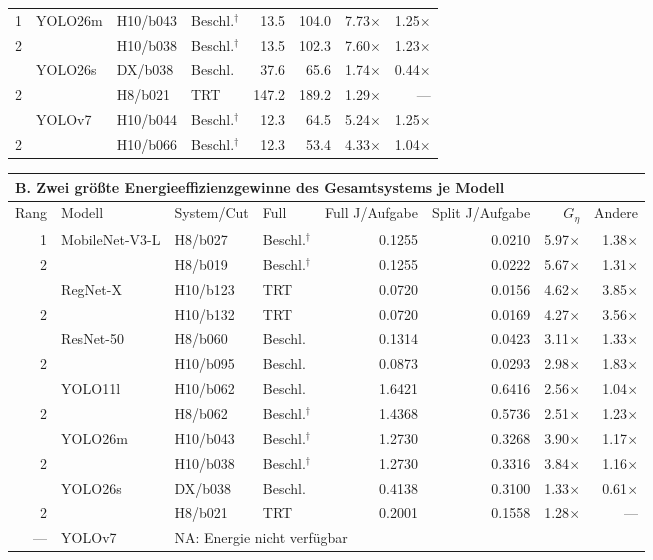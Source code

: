 \begin{table}[!t]
\begin{tabular*}{\textwidth}{@{\extracolsep{\fill}}rlllrrrr@{}}
1 & YOLO26m & H10/b043 & Beschl.$^\dagger$ & 13.5 & 104.0 & 7.73$\times$ & 1.25$\times$\\
2 &  & H10/b038 & Beschl.$^\dagger$ & 13.5 & 102.3 & 7.60$\times$ & 1.23$\times$\\
\addlinespace[1.3pt]
1 & YOLO26s & DX/b038 & Beschl. & 37.6 & 65.6 & 1.74$\times$ & 0.44$\times$\\
2 &  & H8/b021 & TRT & 147.2 & 189.2 & 1.29$\times$ & ---\\
\addlinespace[1.3pt]
1 & YOLOv7 & H10/b044 & Beschl.$^\dagger$ & 12.3 & 64.5 & 5.24$\times$ & 1.25$\times$\\
2 &  & H10/b066 & Beschl.$^\dagger$ & 12.3 & 53.4 & 4.33$\times$ & 1.04$\times$\\
\bottomrule
\end{tabular*}
\par\vspace{0.6em}
\begin{tabular*}{\textwidth}{@{\extracolsep{\fill}}rlllrrrr@{}}
\toprule
\multicolumn{8}{l}{\textbf{B. Zwei größte Energieeffizienzgewinne des Gesamtsystems je Modell}}\\
\midrule
Rang & Modell & System/Cut & Full & Full J/Aufgabe & Split J/Aufgabe & $G_\eta$ & Andere\\
\midrule
1 & MobileNet-V3-L & H8/b027 & Beschl.$^\dagger$ & 0.1255 & 0.0210 & 5.97$\times$ & 1.38$\times$\\
2 &  & H8/b019 & Beschl.$^\dagger$ & 0.1255 & 0.0222 & 5.67$\times$ & 1.31$\times$\\
\addlinespace[1.3pt]
1 & RegNet-X & H10/b123 & TRT & 0.0720 & 0.0156 & 4.62$\times$ & 3.85$\times$\\
2 &  & H10/b132 & TRT & 0.0720 & 0.0169 & 4.27$\times$ & 3.56$\times$\\
\addlinespace[1.3pt]
1 & ResNet-50 & H8/b060 & Beschl. & 0.1314 & 0.0423 & 3.11$\times$ & 1.33$\times$\\
2 &  & H10/b095 & Beschl. & 0.0873 & 0.0293 & 2.98$\times$ & 1.83$\times$\\
\addlinespace[1.3pt]
1 & YOLO11l & H10/b062 & Beschl. & 1.6421 & 0.6416 & 2.56$\times$ & 1.04$\times$\\
2 &  & H8/b062 & Beschl.$^\dagger$ & 1.4368 & 0.5736 & 2.51$\times$ & 1.23$\times$\\
\addlinespace[1.3pt]
1 & YOLO26m & H10/b043 & Beschl.$^\dagger$ & 1.2730 & 0.3268 & 3.90$\times$ & 1.17$\times$\\
2 &  & H10/b038 & Beschl.$^\dagger$ & 1.2730 & 0.3316 & 3.84$\times$ & 1.16$\times$\\
\addlinespace[1.3pt]
1 & YOLO26s & DX/b038 & Beschl. & 0.4138 & 0.3100 & 1.33$\times$ & 0.61$\times$\\
2 &  & H8/b021 & TRT & 0.2001 & 0.1558 & 1.28$\times$ & ---\\
--- & YOLOv7 & \multicolumn{6}{l}{NA: Energie nicht verfügbar}\\
\bottomrule
\end{tabular*}
\endgroup
\end{table}
